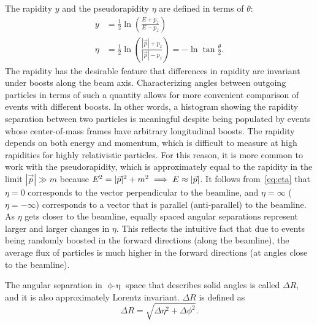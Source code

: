 The rapidity $y$ and the pseudorapidity $\eta$ are defined in terms of $\theta$:
\begin{align}
  y &= \frac{1}{2}\ln\left(\frac{E+p_z}{E-p_z}\right) \\
  \eta &= \frac{1}{2}\ln\left(\frac{|\vec{p}|+p_z}{|\vec{p}|-p_z}\right) = -\ln\tan\frac{\theta}{2}.\label{eq:eta}
\end{align}
The rapidity has the desirable feature that differences in rapidity are
invariant under boosts along the beam axis. Characterizing angles between
outgoing particles in terms of such a quantity allows for more convenient
comparison of events with different boosts. In other words, a histogram showing
the rapidity separation between two particles is meaningful despite being
populated by events whose center-of-mass frames have arbitrary longitudinal
boosts. The rapidity depends on both energy and momentum, which is difficult to
measure at high rapidities for highly relativistic particles. For this reason,
it is more common to work with the pseudorapidity, which is approximately equal
to the rapidity in the limit $|\vec{p}| \gg m$ because $E^2 = \lvert\vec{p}\rvert^2 +
m^2 \implies E \approx |\vec{p}|$. It follows from~\cref{eq:eta} that $\eta=0$
corresponds to the vector perpendicular to the beamline, and $\eta=\infty$
($\eta=-\infty$) corresponds to a vector that is parallel (anti-parallel) to the
beamline. As $\eta$ gets closer to the beamline, equally spaced angular
separations represent larger and larger changes in $\eta$. This reflects the
intuitive fact that due to events being randomly boosted in the forward
directions (along the beamline), the average flux of particles is much higher in
the forward directions (at angles close to the beamline).

The angular separation in $\operatorname{\phi-\eta}$ space that describes solid
angles is called $\Delta R$, and it is also approximately Lorentz invariant.
$\Delta R$ is defined as
\begin{equation}
  \Delta R = \sqrt{\Delta\eta^2 + \Delta\phi^2}.
\end{equation}


